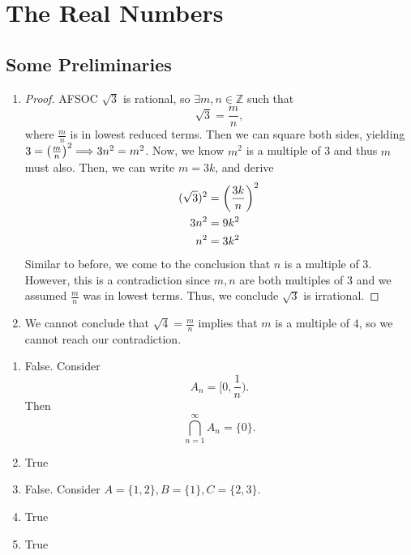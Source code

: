 
\chapter{The Real Numbers}

\setcounter{section}{1}
\section{Some Preliminaries}
\begin{exercise}
\begin{enumerate}[label=(\alph*)]
	\item 
	\begin{proof}
		AFSOC $\sqrt{3}$ is rational, so $\exists m, n \in \mathbb{Z}$ such that 
		\begin{equation}
			\sqrt{3} = \frac{m}{n},
		\end{equation}
		where $\frac{m}{n}$ is in lowest reduced terms.
		Then we can square both sides, yielding $3 = \left(\frac{m}{n}\right)^2 \Longrightarrow 3n^2 = m^2$. Now, we know $m^2$ is a multiple of 3 and thus $m$ must also. Then, we can write $m = 3k$, and derive
		\begin{align*}
		(\sqrt{3})^2 &= \left(\frac{3k}{n}\right)^2 \\
		3n^2 &= 9k^2 \\
		n^2 &= 3k^2
		\end{align*}
		Similar to before, we come to the conclusion that $n$ is a multiple of 3. However, this is a contradiction since $m, n$ are both multiples of 3 and we assumed $\frac{m}{n}$ was in lowest terms. Thus, we conclude $\sqrt{3}$ is irrational.
	\end{proof}
	\item We cannot conclude that $\sqrt{4} = \frac{m}{n}$ implies that $m$ is a multiple of $4$, so we cannot reach our contradiction.
\end{enumerate}
\end{exercise}

\begin{exercise}
	\begin{enumerate}[label=(\alph*)]
		\item False. Consider 
		\begin{equation}
			A_n = [0, \frac{1}{n}).
		\end{equation}
		Then 
		\begin{equation}
			\bigcap_{n=1}^\infty A_n = \{0\}.
		\end{equation}
		\item True
		\item False. Consider $A = \{1, 2\}, B = \{1\}, C = \{2, 3\}$.
		\item True
		\item True
	\end{enumerate}
\end{exercise}

